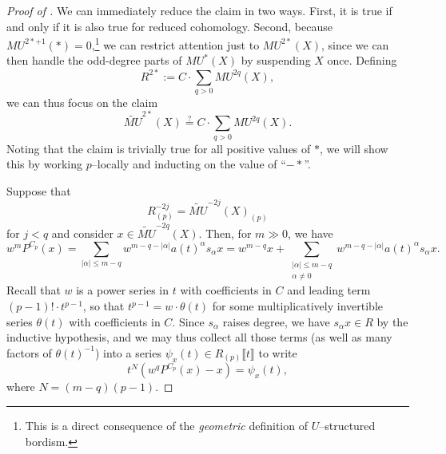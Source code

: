\begin{proof}[{Proof of }]
We can immediately reduce the claim in two ways.  First, it is true if and only if it is also true for reduced cohomology.  Second, because $MU^{2*+1}(*) = 0$,\footnote{This is a direct consequence of the \emph{geometric} definition of $U$--structured bordism.} we can restrict attention just to $MU^{2*}(X)$, since we can then handle the odd-degree parts of $MU^*(X)$ by suspending $X$ once.  Defining \[R^{2*} := C \cdot \sum_{q > 0} MU^{2q}(X),\] we can thus focus on the claim \[\widetilde{MU}^{2*}(X) \stackrel{?}{=} C \cdot \sum_{q > 0} MU^{2q}(X).\]  Noting that the claim is trivially true for all positive values of $*$, we will show this by working $p$--locally and inducting on the value of ``$-*$''.

Suppose that \[R^{-2j}_{(p)} = \widetilde{MU}^{-2j}(X)_{(p)}\] for $j < q$ and consider $x \in \widetilde{MU}^{-2q}(X)$.  Then, for $m \gg 0$, we have \[w^m P^{C_p}(x) = \sum_{|\alpha| \le m-q} w^{m-q - |\alpha|} a(t)^\alpha s_\alpha x = w^{m-q} x + \sum_{\substack{|\alpha| \le m-q \\ \alpha \ne 0}} w^{m-q - |\alpha|} a(t)^\alpha s_\alpha x.\]  Recall that $w$ is a power series in $t$ with coefficients in $C$ and leading term $(p-1)! \cdot t^{p-1}$, so that $t^{p-1} = w \cdot \theta(t)$ for some multiplicatively invertible series $\theta(t)$ with coefficients in $C$.  Since $s_\alpha$ raises degree, we have $s_\alpha x \in R$ by the inductive hypothesis, and we may thus collect all those terms (as well as many factors of $\theta(t)^{-1}$) into a series $\psi_x(t) \in R_{(p)}\llbracket t \rrbracket$ to write \[t^N(w^q P^{C_p}(x) - x) = \psi_x(t),\] where $N = (m-q)(p-1)$.


\end{proof}
